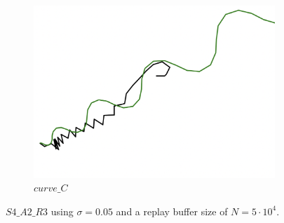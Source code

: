 \begin{figure}[H]
\begin{subfigure}[b]{0.31\textwidth}
         \includegraphics[width=\textwidth]{images/ddpg_results/envs_S3_S4_S5/S4_A2_R3_curve_C.png}
         \caption{$curve\_C$}
         \label{fig:a5c}
     \end{subfigure}
        \caption{$S4\_A2\_R3$ using $\sigma=0.05$ and a replay buffer size of $N=5\cdot 10^4$.}
        \label{fig:advCurves5}
\end{figure}

